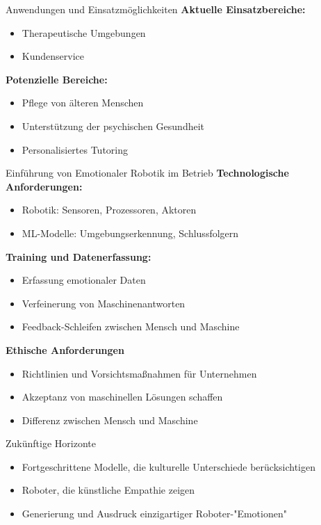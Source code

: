 \documentclass[aspectratio=169]{beamer}
\begin{document}
\begin{frame}{Anwendungen und Einsatzmöglichkeiten}
  \textbf{Aktuelle Einsatzbereiche:}
  \begin{itemize}
      \item Therapeutische Umgebungen
      \item Kundenservice
  \end{itemize}

  \textbf{Potenzielle Bereiche:}
  \begin{itemize}
      \item Pflege von älteren Menschen
      \item Unterstützung der psychischen Gesundheit
      \item Personalisiertes Tutoring
  \end{itemize}
\end{frame}

\begin{frame}{Einführung von Emotionaler Robotik im Betrieb}
  \textbf{Technologische Anforderungen:}
  \begin{itemize}
      \item Robotik: Sensoren, Prozessoren, Aktoren 
      \item ML-Modelle: Umgebungserkennung, Schlussfolgern
  \end{itemize}
  \textbf{Training und Datenerfassung:}
  \begin{itemize}
      \item Erfassung emotionaler Daten
      \item Verfeinerung von Maschinenantworten
      \item Feedback-Schleifen zwischen Mensch und Maschine
  \end{itemize}

  \textbf{Ethische Anforderungen}
  \begin{itemize}
      \item Richtlinien und Vorsichtsmaßnahmen für Unternehmen
      \item Akzeptanz von maschinellen Lösungen schaffen
      \item Differenz zwischen Mensch und Maschine
  \end{itemize}
\end{frame}

\begin{frame}{Zukünftige Horizonte}
  \begin{itemize}
      \item Fortgeschrittene Modelle, die kulturelle Unterschiede berücksichtigen
      \item Roboter, die künstliche Empathie zeigen
      \item Generierung und Ausdruck einzigartiger Roboter-"Emotionen"
  \end{itemize}
\end{frame}
\end{document}
